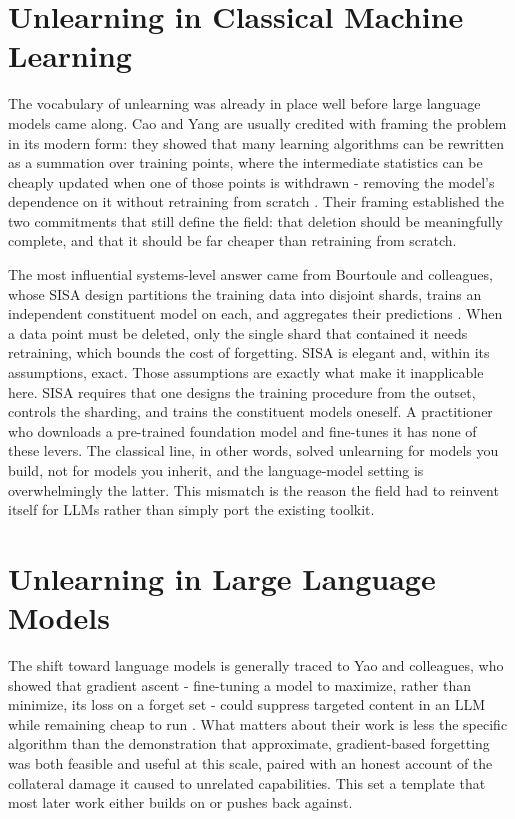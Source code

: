 \documentclass[a4paper,12pt]{report}
\begin{document}
\section{Unlearning in Classical Machine Learning}
The vocabulary of unlearning was already in place well before large language models came along. Cao and Yang are usually credited with framing the problem in its modern form: they showed that many learning algorithms can be rewritten as a summation over training points, where the intermediate statistics can be cheaply updated when one of those points is withdrawn - removing the model's dependence on it without retraining from scratch \parencite{cao2015unlearning}. Their framing established the two commitments that still define the field: that deletion should be meaningfully complete, and that it should be far cheaper than retraining from scratch.

The most influential systems-level answer came from Bourtoule and colleagues, whose SISA design partitions the training data into disjoint shards, trains an independent constituent model on each, and aggregates their predictions \parencite{bourtoule2021machine}. When a data point must be deleted, only the single shard that contained it needs retraining, which bounds the cost of forgetting. SISA is elegant and, within its assumptions, exact. Those assumptions are exactly what make it inapplicable here. SISA requires that one designs the training procedure from the outset, controls the sharding, and trains the constituent models oneself. A practitioner who downloads a pre-trained foundation model and fine-tunes it has none of these levers. The classical line, in other words, solved unlearning for models you build, not for models you inherit, and the language-model setting is overwhelmingly the latter. This mismatch is the reason the field had to reinvent itself for LLMs rather than simply port the existing toolkit.

\section{Unlearning in Large Language Models}
The shift toward language models is generally traced to Yao and colleagues, who showed that gradient ascent - fine-tuning a model to maximize, rather than minimize, its loss on a forget set - could suppress targeted content in an LLM while remaining cheap to run \parencite{yao2023unlearning}. What matters about their work is less the specific algorithm than the demonstration that approximate, gradient-based forgetting was both feasible and useful at this scale, paired with an honest account of the collateral damage it caused to unrelated capabilities. This set a template that most later work either builds on or pushes back against.
\end{document}
